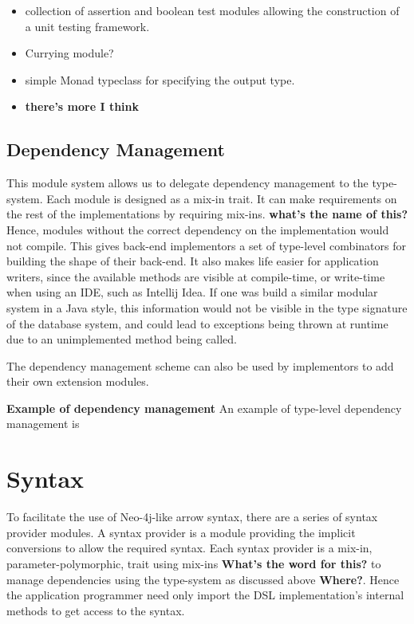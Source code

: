 \documentclass{report}
\newcommand \2[0]{\textbf{2}}
\newcommand \3[0]{\textbf{3}}
\newcommand{\todo}[1]{\textbf{#1}}
\begin{document}
\begin{itemize}
    \item collection of assertion and boolean test modules allowing the construction of a unit testing framework.
    \item Currying module?
    \item simple Monad typeclass for specifying the output type.
    \item \todo{there's more  I think}
\end{itemize}

\subsection{Dependency Management}
This module system allows us to delegate dependency management to the type-system. Each module is designed as a mix-in trait. It can make requirements on the rest of the implementations by requiring mix-ins. \todo{what's the name of this?} Hence, modules without the correct dependency on the implementation would not compile. This gives back-end implementors a set of type-level combinators for building the shape of their back-end. It also makes life easier for application writers, since the available methods are visible at compile-time, or write-time when using an IDE, such as Intellij Idea. If one was build a similar modular system in a Java style, this information would not be visible in the type signature of the database system, and could lead to exceptions being thrown at runtime due to an unimplemented method being called.

The dependency management scheme can also be used by implementors to add their own extension modules.

\todo{Example of dependency management}
An example of type-level dependency management is 


\section{Syntax}
To facilitate the use of Neo-4j-like arrow syntax, there are a series of syntax provider modules. A syntax provider is a module providing the implicit conversions to allow the required syntax. Each syntax provider is a mix-in, parameter-polymorphic, trait using mix-ins \todo{What's the word for this?} to manage dependencies using the type-system as discussed above \todo{Where?}. Hence the application programmer need only import the DSL implementation's internal methods to get access to the syntax.
\end{document}
